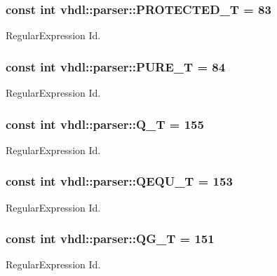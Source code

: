 \subsubsection[{P\+R\+O\+T\+E\+C\+T\+E\+D\+\_\+\+T}]{\setlength{\rightskip}{0pt plus 5cm}const int vhdl\+::parser\+::\+P\+R\+O\+T\+E\+C\+T\+E\+D\+\_\+\+T = 83}\label{namespacevhdl_1_1parser_aa6644820445a33e93a8e97e637a2c5c1}
Regular\+Expression Id. \hypertarget{namespacevhdl_1_1parser_a4161e3ab0a9e4f0a4498a58ce738dac7}{}
\subsubsection[{P\+U\+R\+E\+\_\+\+T}]{\setlength{\rightskip}{0pt plus 5cm}const int vhdl\+::parser\+::\+P\+U\+R\+E\+\_\+\+T = 84}\label{namespacevhdl_1_1parser_a4161e3ab0a9e4f0a4498a58ce738dac7}
Regular\+Expression Id. \hypertarget{namespacevhdl_1_1parser_aae232c2675c2d07a5a69c5596b41e328}{}
\subsubsection[{Q\+\_\+\+T}]{\setlength{\rightskip}{0pt plus 5cm}const int vhdl\+::parser\+::\+Q\+\_\+\+T = 155}\label{namespacevhdl_1_1parser_aae232c2675c2d07a5a69c5596b41e328}
Regular\+Expression Id. \hypertarget{namespacevhdl_1_1parser_a402ecedeab9449118fe74d1b583ec966}{}
\subsubsection[{Q\+E\+Q\+U\+\_\+\+T}]{\setlength{\rightskip}{0pt plus 5cm}const int vhdl\+::parser\+::\+Q\+E\+Q\+U\+\_\+\+T = 153}\label{namespacevhdl_1_1parser_a402ecedeab9449118fe74d1b583ec966}
Regular\+Expression Id. \hypertarget{namespacevhdl_1_1parser_a428e9f883492307055af9727f61b88b5}{}
\subsubsection[{Q\+G\+\_\+\+T}]{\setlength{\rightskip}{0pt plus 5cm}const int vhdl\+::parser\+::\+Q\+G\+\_\+\+T = 151}\label{namespacevhdl_1_1parser_a428e9f883492307055af9727f61b88b5}
Regular\+Expression Id. \hypertarget{namespacevhdl_1_1parser_a8c898e44cc375fd8ef3af04fcc65e0dd}{}
